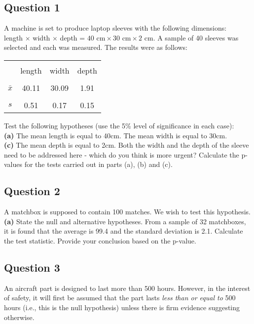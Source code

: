 \documentclass[12pt]{article}
\begin{document}
\subsection*{Question 1}
A machine is set to produce laptop sleeves with the following dimensions:\\ length $\times$ width $\times$ depth = $40 \text{ cm} \times  30 \text{ cm} \times 2 \text{ cm}$. A sample of 40 sleeves was selected and each was measured. The results were as follows:\\[-0.2cm]
\begin{center}
\begin{tabular}{|c|c|c|c|}
\hline
&&&\\[-0.4cm]
& length & width & depth \\
\hline
&&&\\[-0.4cm]
$\bar x$ & 40.11 & 30.09  & 1.91 \\
\hline
&&&\\[-0.4cm]
$s$ & 0.51 & 0.17 & 0.15 \\
\hline
\end{tabular}
\end{center}

Test the following hypotheses (use the 5\% level of significance in each case):\\[0.2cm]
{\bf(a)} The mean length is equal to 40cm.  The mean width is equal to 30cm. \quad \\{\bf(c)} The mean depth is equal to 2cm.  Both the width and the depth of the sleeve need to be addressed here - which do you think is more urgent?   Calculate the p-values for the tests carried out in parts (a), (b) and (c).



\subsection*{Question 2}
A matchbox is supposed to contain 100 matches. We wish to test this hypothesis.  \\[-0.2cm]

{\bf(a)} State the null and alternative hypotheses.  From a sample of 32 matchboxes, it is found that the average is 99.4 and the standard deviation is 2.1. Calculate the test statistic.  Provide your conclusion based on the p-value.



\subsection*{Question 3}
An aircraft part is designed to last more than 500 hours. However, in the interest of safety, it will first be assumed that the part lasts \emph{less than or equal to} 500 hours (i.e., this is the null hypothesis) unless there is firm evidence suggesting otherwise.\\[-0.2cm]
\end{document}
